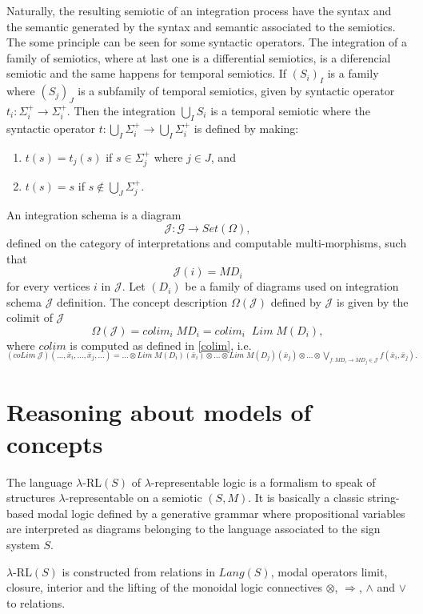 \documentclass[oribibl]{llncs}
\newcommand{\G}{\mathcal{G}}
\newcommand{\J}{\mathcal{J}}
\begin{document}
Naturally, the resulting semiotic of an integration process have the syntax and the semantic generated by the syntax and semantic associated to the semiotics. The some principle can be seen for some syntactic operators. The integration of a family of semiotics, where at last one is a  differential semiotics, is a diferencial semiotic and the same happens for temporal semiotics. If $(S_i)_I$ is a family where $(S_j)_J$ is a subfamily of temporal semiotics, given by syntactic operator $t_i:\Sigma^+_i\rightarrow\Sigma^+_i$. Then the integration $\bigcup_IS_i$ is a temporal semiotic where the syntactic operator $t:\bigcup_I\Sigma^+_i\rightarrow\bigcup_I\Sigma^+_i$ is defined by making:
\begin{enumerate}
  \item $t(s)=t_j(s)$ if $s\in \Sigma^+_j$ where $j\in J$, and
  \item $t(s)=s$ if $s\not\in \bigcup_J\Sigma^+_j$.
\end{enumerate}

An integration schema is a diagram \[\J:\G\rightarrow Set(\Omega),\] defined on the category of interpretations and computable multi-morphisms, such that \[\J(i)=MD_i\] for every vertices $i$ in $\J$. Let $(D_i)$ be a family of diagrams used on integration schema $\J$ definition. The concept description  $\Omega(\J)$ defined by $\J$ is given by the colimit of $\J$
\[\Omega(\J)=colim_i\;MD_i=colim_i\;\;Lim\;M(D_i),\]
where $colim$ is computed as defined in \ref{colim}, i.e.
\[
_{(coLim\;\J)(\ldots,\bar{x}_i,\ldots,\bar{x}_j,\ldots)=\ldots\otimes Lim\;M(D_i)(\bar{x}_i)\otimes\ldots\otimes Lim\;M(D_j)(\bar{x}_j)\otimes\ldots\otimes\bigvee_{f:MD_i\rightarrow MD_j\in \J} f(\bar{x}_i,\bar{x}_j).}
\]


\section{Reasoning about models of concepts}\label{reasoning}

The language $\lambda$-RL$(S)$ of $\lambda$-representable logic is a
formalism to speak of structures $\lambda$-representable on a
semiotic $(S,M)$. It is basically a classic string-based modal logic
defined by a generative grammar where propositional variables are
interpreted as diagrams belonging to the language associated to the
sign system $S$.

$\lambda$-RL$(S)$ is constructed from relations in $Lang(S)$, modal
operators limit, closure, interior and the lifting of the monoidal logic
connectives  $\otimes$, $\Rightarrow$, $\wedge$ and $\vee$ to relations.
\end{document}
